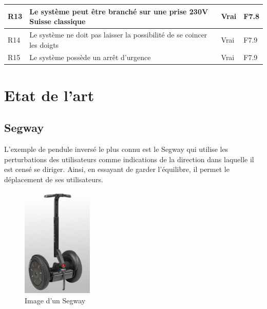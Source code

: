 \begin{table}[H]
{\begin{tabular}{|l|l|l|l|}
            R13                                                                                                                     & Le système peut être branché sur une prise 230V Suisse classique        & Vrai                     & F7.8              \\ \hline
            R14                                                                                                                     & Le système ne doit pas laisser la possibilité de se coincer les doigts  & Vrai                     & F7.9              \\ \hline
            R15                                                                                                                     & Le système possède un arrêt d'urgence                                   & Vrai                     & F7.9              \\ \hline
        \end{tabular}%
    }
\end{table}

\section{Etat de l'art}\label{sec:EtatArt}

\subsection{Segway}

L'exemple de pendule inversé le plus connu est le Segway \cite{Segway} qui utilise les perturbations des utilisateurs comme indications de la direction dans laquelle il est censé se diriger. Ainsi, en essayant de garder l'équilibre, il permet le déplacement de ses utilisateurs.

\begin{figure}[H]
    \centering
    \includegraphics[width = 0.3\textwidth]{assets/figures/Segway.png}
    \caption{Image d'un Segway \cite{Segway}}
    \label{fig:Segway}
\end{figure}

